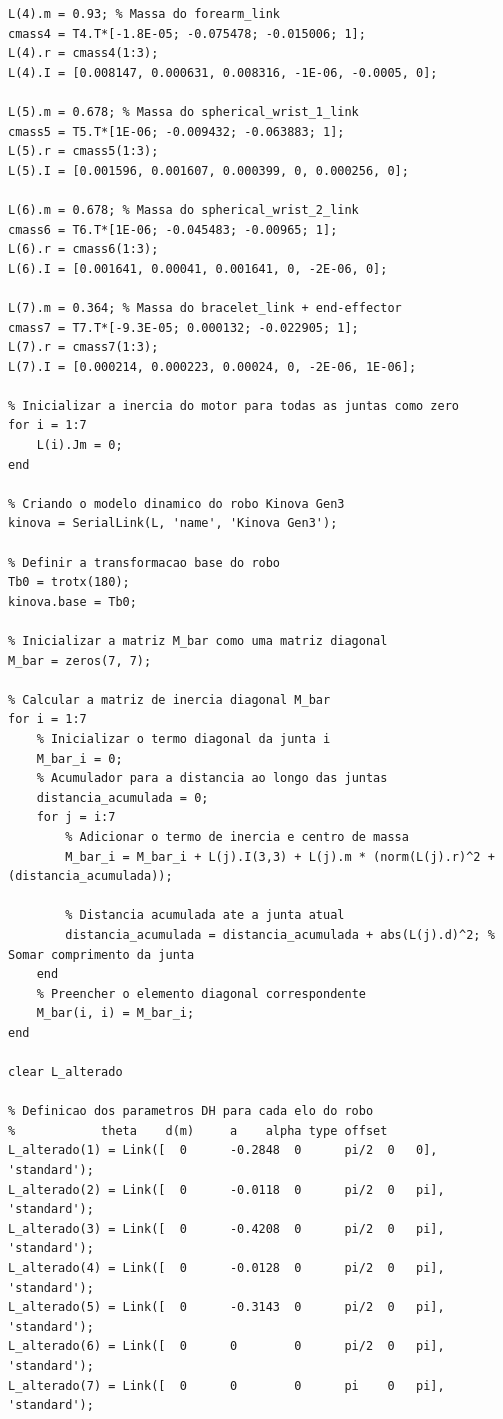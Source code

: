 \documentclass[10pt]{article}
\begin{document}
\begin{lstlisting}[caption={Código principal do trabalho}, label={code:codigo}]
L(4).m = 0.93; % Massa do forearm_link
cmass4 = T4.T*[-1.8E-05; -0.075478; -0.015006; 1];
L(4).r = cmass4(1:3);
L(4).I = [0.008147, 0.000631, 0.008316, -1E-06, -0.0005, 0];

L(5).m = 0.678; % Massa do spherical_wrist_1_link
cmass5 = T5.T*[1E-06; -0.009432; -0.063883; 1];
L(5).r = cmass5(1:3);
L(5).I = [0.001596, 0.001607, 0.000399, 0, 0.000256, 0];

L(6).m = 0.678; % Massa do spherical_wrist_2_link
cmass6 = T6.T*[1E-06; -0.045483; -0.00965; 1];
L(6).r = cmass6(1:3);
L(6).I = [0.001641, 0.00041, 0.001641, 0, -2E-06, 0];

L(7).m = 0.364; % Massa do bracelet_link + end-effector
cmass7 = T7.T*[-9.3E-05; 0.000132; -0.022905; 1];
L(7).r = cmass7(1:3);
L(7).I = [0.000214, 0.000223, 0.00024, 0, -2E-06, 1E-06];

% Inicializar a inercia do motor para todas as juntas como zero
for i = 1:7
    L(i).Jm = 0;
end

% Criando o modelo dinamico do robo Kinova Gen3
kinova = SerialLink(L, 'name', 'Kinova Gen3');

% Definir a transformacao base do robo
Tb0 = trotx(180);
kinova.base = Tb0;

% Inicializar a matriz M_bar como uma matriz diagonal
M_bar = zeros(7, 7);

% Calcular a matriz de inercia diagonal M_bar
for i = 1:7
    % Inicializar o termo diagonal da junta i
    M_bar_i = 0;
    % Acumulador para a distancia ao longo das juntas
    distancia_acumulada = 0;
    for j = i:7
        % Adicionar o termo de inercia e centro de massa
        M_bar_i = M_bar_i + L(j).I(3,3) + L(j).m * (norm(L(j).r)^2 + (distancia_acumulada));

        % Distancia acumulada ate a junta atual
        distancia_acumulada = distancia_acumulada + abs(L(j).d)^2; % Somar comprimento da junta
    end
    % Preencher o elemento diagonal correspondente
    M_bar(i, i) = M_bar_i;
end

clear L_alterado

% Definicao dos parametros DH para cada elo do robo
%            theta    d(m)     a    alpha type offset
L_alterado(1) = Link([  0      -0.2848  0      pi/2  0   0], 'standard');
L_alterado(2) = Link([  0      -0.0118  0      pi/2  0   pi], 'standard');
L_alterado(3) = Link([  0      -0.4208  0      pi/2  0   pi], 'standard');
L_alterado(4) = Link([  0      -0.0128  0      pi/2  0   pi], 'standard');
L_alterado(5) = Link([  0      -0.3143  0      pi/2  0   pi], 'standard');
L_alterado(6) = Link([  0      0        0      pi/2  0   pi], 'standard');
L_alterado(7) = Link([  0      0        0      pi    0   pi], 'standard');


\end{lstlisting}
\end{document}
